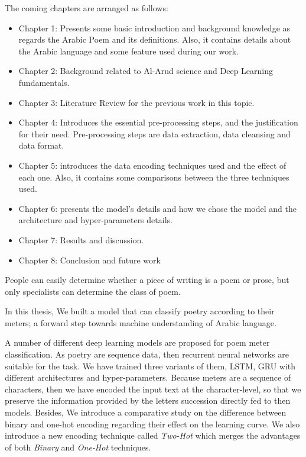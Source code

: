 \newpage


\begin{spacing}{1}\end{spacing}
The coming chapters are arranged as follows:
\begin{itemize}
\item Chapter 1: Presents some basic introduction and background knowledge as regards the Arabic Poem and its definitions. Also, it contains details about the Arabic language and some feature used during our work.
  \item Chapter 2: Background related to Al-Arud science and Deep Learning fundamentals. 
  \item Chapter 3: Literature Review for the previous work in this topic.    
  \item Chapter 4: Introduces the essential pre-processing steps, and the justification for their need. Pre-processing steps are data extraction, data cleansing and data format.
  \item Chapter 5: introduces the data encoding techniques used and the effect of each one. Also, it contains some comparisons between the three techniques used.
  \item Chapter 6: presents the model's details and how we chose the model and the architecture and hyper-parameters details.
  \item Chapter 7: Results and discussion.
  \item Chapter 8: Conclusion and future work
\end{itemize}


 \newpage




\begin{spacing}{1}\end{spacing}


People can easily determine whether a piece of writing is a poem or prose, but only specialists can determine the class of poem.

In this thesis, We built a model that can classify poetry according to their meters; a forward step towards machine understanding of Arabic language.

A number of different deep learning models are proposed for poem meter classification. As poetry are sequence data, then recurrent neural networks are suitable for the task. We have trained three variants of them, LSTM, GRU with different architectures and hyper-parameters. Because meters are a sequence of characters, then we have encoded the input text at the character-level, so that we preserve the information provided by the letters succession directly fed to then models. Besides, We introduce a comparative study on the difference between binary and one-hot encoding regarding their effect on the learning curve. We also introduce a new encoding technique called \textit{Two-Hot} which merges the advantages of both \textit{Binary} and \textit{One-Hot} techniques.


